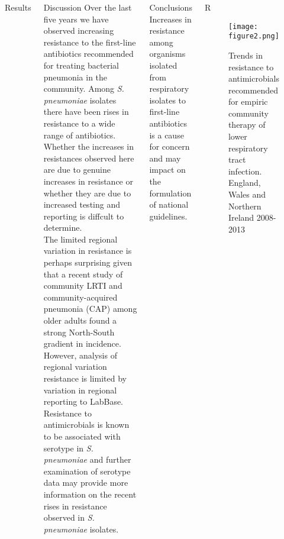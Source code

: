 \documentclass[final, 14pt]{beamer}
\begin{document}
\begin{frame}
\begin{columns}[t]
\begin{minipage}[t]{.95\textwidth}
\begin{block}{Results}
   \end{block}
   \vfill
  \begin{block}{Discussion}
  Over the last five years we have observed increasing resistance to the first-line antibiotics recommended for treating bacterial pneumonia in the community.
Among \textit{S. pneumoniae} isolates there have been rises in resistance to a wide range of antibiotics. 
Whether the increases in resistances observed here are due to genuine increases in resistance or whether they are due to increased testing and reporting is diffcult to determine. \\
The limited regional variation in resistance is perhaps surprising given that a recent study of community LRTI and community-acquired pneumonia (CAP) among older adults found a strong North-South gradient in incidence. \citep{Millett2013}
However, analysis of regional variation resistance is limited by variation in regional reporting to LabBase. \\
Resistance to antimicrobials is known to be associated with serotype in \textit{S. pneumoniae} and further examination of serotype data may provide more information on the recent rises in resistance observed in \textit{S. pneumoniae} isolates.
   \vspace{1 cm}

\end{block}
     \vfill
\begin{block}{Conclusions}
  Increases in resistance among organisms isolated from respiratory isolates to first-line antibiotics is a cause for concern and may impact on the formulation of national guidelines.  
        \vspace{1 cm}
\end{block}
     \vfill

\end{minipage}
    
 \begin{minipage}[t]{.95\textwidth} %
  \begin{block}{\textcolor{comp_blue}{R}}
   \begin{figure}
  \texttt{[image: figure2.png]}
  \caption{Trends in resistance to antimicrobials recommended for empiric community therapy of lower respiratory tract infection. England, Wales and Northern Ireland 2008-2013}
  \label{fig:fig2} 
  \end{figure} 


\end{block}
\end{minipage}
\end{columns}
\end{frame}
\end{document}
